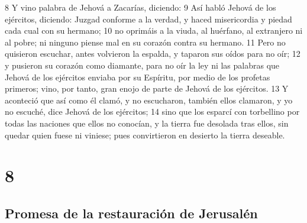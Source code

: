 8 Y vino palabra de Jehová a Zacarías, diciendo:
9 Así habló Jehová de los ejércitos, diciendo: Juzgad conforme a la verdad, y haced misericordia y piedad cada cual con su hermano;
10 no oprimáis a la viuda, al huérfano, al extranjero ni al pobre; ni ninguno piense mal en su corazón contra su hermano.
11 Pero no quisieron escuchar, antes volvieron la espalda, y taparon sus oídos para no oír;
12 y pusieron su corazón como diamante, para no oír la ley ni las palabras que Jehová de los ejércitos enviaba por su Espíritu, por medio de los profetas primeros; vino, por tanto, gran enojo de parte de Jehová de los ejércitos. 
13 Y aconteció que así como él clamó, y no escucharon, también ellos clamaron, y yo no escuché, dice Jehová de los ejércitos;
14 sino que los esparcí con torbellino por todas las naciones que ellos no conocían, y la tierra fue desolada tras ellos, sin quedar quien fuese ni viniese; pues convirtieron en desierto la tierra deseable.

\chapter{8}

\section*{Promesa de la restauración de Jerusalén}

